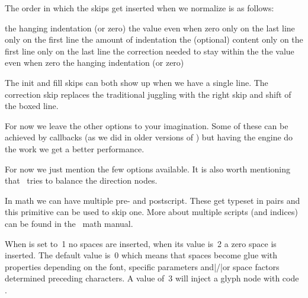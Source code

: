 \starttworows
{}
\stoptworows

The order in which the skips get inserted when we normalize is as follows:

\starttabulate
\NC {}     \NC the hanging indentation (or zero) \NC \NR
\NC {}         \NC the value even when zero \NC \NR
\NC {}  \NC only on the last line \NC \NR
\NC {}  \NC only on the first line \NC \NR
\NC {}       \NC the amount of indentation \NC \NR
\NC \unknown                \NC the (optional) content \NC \NR
\NC {} \NC only on the first line \NC \NR
\NC {} \NC only on the last line \NC \NR
\NC {}   \NC the correction needed to stay within the  \NC \NR
\NC {}        \NC the value even when zero \NC \NR
\NC {}    \NC the hanging indentation (or zero) \NC \NR
\stoptabulate

The init and fill skips can both show up when we have a single line. The
correction skip replaces the traditional juggling with the right skip and shift
of the boxed line.

For now we leave the other options to your imagination. Some of these can be
achieved by callbacks (as we did in older versions of \CONTEXT) but having the
engine do the work we get a better performance.

\stopnewprimitive

\startnewprimitive[title={\prm {normalizeparmode}}]

For now we just mention the few options available. It is also worth mentioning that
\LUAMETATEX\ tries to balance the direction nodes.

\starttworows
{}
\stoptworows

\stopnewprimitive

\startnewprimitive[title={\prm {noscript}}]

In math we can have multiple pre- and postscript. These get typeset in pairs and
this primitive can be used to skip one. More about multiple scripts (and indices)
can be found in the \CONTEXT\ math manual.

\stopnewprimitive

\startnewprimitive[title={\prm {nospaces}}]

When  is set to~1 no spaces are inserted, when its value is~2 a
zero space is inserted. The default value is~0 which means that spaces become
glue with properties depending on the font, specific parameters and|/|or space
factors determined preceding characters. A value of~3 will inject a glyph node
with code .

